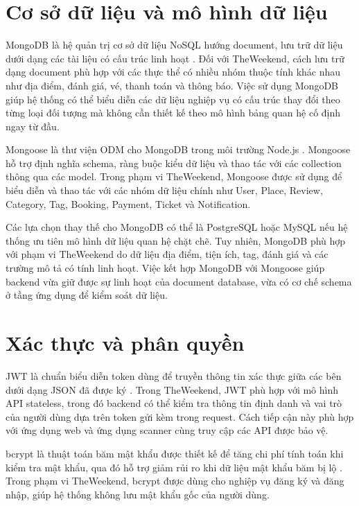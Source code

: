 \documentclass[../DoAn.tex]{subfiles}
\begin{document}
\section{Cơ sở dữ liệu và mô hình dữ liệu}

MongoDB là hệ quản trị cơ sở dữ liệu NoSQL hướng document, lưu trữ dữ liệu dưới dạng các tài liệu có cấu trúc linh hoạt \cite{mongodb_docs}. Đối với TheWeekend, cách lưu trữ dạng document phù hợp với các thực thể có nhiều nhóm thuộc tính khác nhau như địa điểm, đánh giá, vé, thanh toán và thông báo. Việc sử dụng MongoDB giúp hệ thống có thể biểu diễn các dữ liệu nghiệp vụ có cấu trúc thay đổi theo từng loại đối tượng mà không cần thiết kế theo mô hình bảng quan hệ cố định ngay từ đầu.

Mongoose là thư viện ODM cho MongoDB trong môi trường Node.js \cite{mongoose_docs}. Mongoose hỗ trợ định nghĩa schema, ràng buộc kiểu dữ liệu và thao tác với các collection thông qua các model. Trong phạm vi TheWeekend, Mongoose được sử dụng để biểu diễn và thao tác với các nhóm dữ liệu chính như User, Place, Review, Category, Tag, Booking, Payment, Ticket và Notification.

Các lựa chọn thay thế cho MongoDB có thể là PostgreSQL hoặc MySQL nếu hệ thống ưu tiên mô hình dữ liệu quan hệ chặt chẽ. Tuy nhiên, MongoDB phù hợp với phạm vi TheWeekend do dữ liệu địa điểm, tiện ích, tag, đánh giá và các trường mô tả có tính linh hoạt. Việc kết hợp MongoDB với Mongoose giúp backend vừa giữ được sự linh hoạt của document database, vừa có cơ chế schema ở tầng ứng dụng để kiểm soát dữ liệu.

\section{Xác thực và phân quyền}

JWT là chuẩn biểu diễn token dùng để truyền thông tin xác thực giữa các bên dưới dạng JSON đã được ký \cite{jwt_rfc7519}. Trong TheWeekend, JWT phù hợp với mô hình API stateless, trong đó backend có thể kiểm tra thông tin định danh và vai trò của người dùng dựa trên token gửi kèm trong request. Cách tiếp cận này phù hợp với ứng dụng web và ứng dụng scanner cùng truy cập các API được bảo vệ.

bcrypt là thuật toán băm mật khẩu được thiết kế để tăng chi phí tính toán khi kiểm tra mật khẩu, qua đó hỗ trợ giảm rủi ro khi dữ liệu mật khẩu băm bị lộ \cite{bcrypt_paper}. Trong phạm vi TheWeekend, bcrypt được dùng cho nghiệp vụ đăng ký và đăng nhập, giúp hệ thống không lưu mật khẩu gốc của người dùng.
\end{document}
